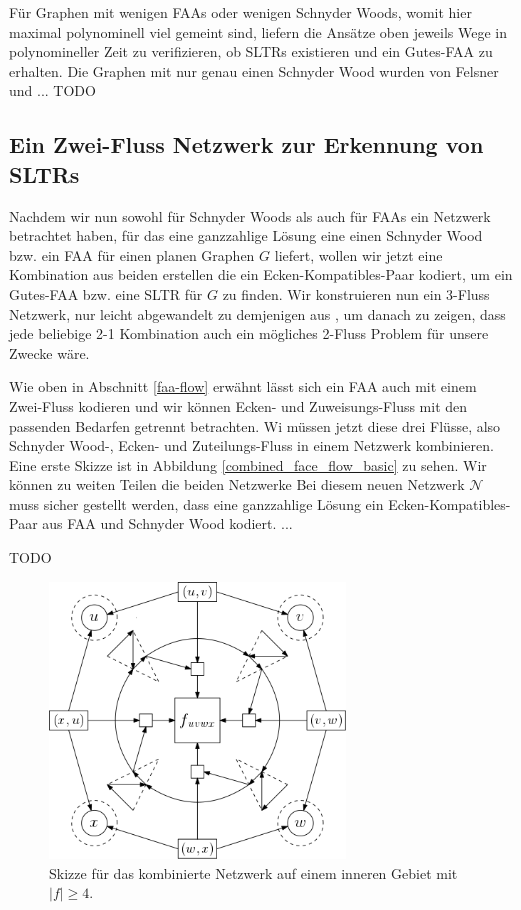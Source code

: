 

\begin{remark}
Für Graphen mit wenigen FAAs oder wenigen Schnyder Woods, womit hier maximal polynominell viel gemeint sind, liefern die Ansätze oben jeweils Wege in polynomineller Zeit zu verifizieren, ob SLTRs existieren und ein Gutes-FAA zu erhalten. Die Graphen mit nur genau einen Schnyder Wood wurden von Felsner und ... TODO 
\end{remark}

\subsection{Ein Zwei-Fluss Netzwerk zur Erkennung von SLTRs}

Nachdem wir nun sowohl für Schnyder Woods als auch für FAAs ein Netzwerk betrachtet haben, für das eine ganzzahlige Lösung eine einen Schnyder Wood bzw. ein FAA für einen planen Graphen $G$ liefert, wollen wir jetzt eine Kombination aus beiden erstellen die ein Ecken-Kompatibles-Paar kodiert, um ein Gutes-FAA bzw. eine SLTR für $G$ zu finden. Wir konstruieren nun ein 3-Fluss Netzwerk, nur leicht abgewandelt zu demjenigen aus \cite{af15}, um danach zu zeigen, dass jede beliebige 2-1 Kombination auch ein mögliches 2-Fluss Problem für unsere Zwecke wäre.\

Wie oben in Abschnitt \ref{faa-flow} erwähnt lässt sich ein FAA auch mit einem Zwei-Fluss kodieren und wir können Ecken- und Zuweisungs-Fluss mit den passenden Bedarfen getrennt betrachten. Wi müssen jetzt diese drei Flüsse, also Schnyder Wood-, Ecken- und Zuteilungs-Fluss in einem Netzwerk kombinieren. Eine erste Skizze ist in Abbildung \ref{combined_face_flow_basic} zu sehen. Wir können zu weiten Teilen die beiden Netzwerke 
Bei diesem neuen Netzwerk $\mathcal{N}$ muss sicher gestellt werden, dass eine ganzzahlige Lösung ein Ecken-Kompatibles-Paar aus FAA und Schnyder Wood kodiert. ... 

TODO 

\begin{figure}[h]
	\centering
  	\includegraphics[width=0.7\textwidth]{combined_face_sketch.png}
  	\caption{Skizze für das kombinierte Netzwerk auf einem inneren Gebiet mit $|f| \geq 4$.}
\end{figure}